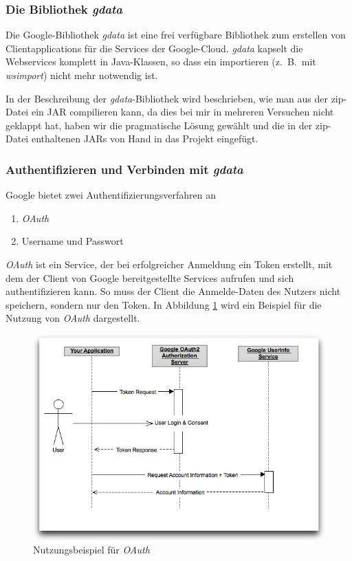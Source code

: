 \subsubsection{Die Bibliothek \emph{gdata}}
Die Google-Bibliothek \emph{gdata} ist eine frei verf\"ugbare Bibliothek zum erstellen von
 Clientapplications für die Services der Google-Cloud.
\emph{gdata} kapselt die Webservices komplett in Java-Klassen, so dass ein importieren
 (z.\ B.\ mit \emph{wsimport}) nicht mehr notwendig ist.

In der Beschreibung der \emph{gdata}-Bibliothek wird beschrieben, wie man aus der zip-Datei
 ein JAR compilieren kann, da dies bei mir in mehreren Versuchen nicht geklappt hat,
 haben wir die pragmatische Lösung gewählt und die in der zip-Datei enthaltenen JARs von Hand
 in das Projekt eingefügt.

\subsubsection{Authentifizieren und Verbinden mit \emph{gdata}}
Google bietet zwei Authentifizierungsverfahren an
\begin{enumerate}
	\item\emph{OAuth}
	\item Username und Passwort
\end{enumerate}
\emph{OAuth} ist ein Service, der bei erfolgreicher Anmeldung ein Token erstellt, mit dem
 der Client von Google bereitgestellte Services aufrufen und sich authentifizieren kann.
So muss der Client die Anmelde-Daten des Nutzers nicht speichern, sondern nur den Token.
In Abbildung \ref{fig:google_oauth} wird ein Beispiel f\"ur die Nutzung von \emph{OAuth} dargestellt.
\begin{figure}[h!]
\includegraphics[width=\textwidth]{Bilder/googleOauth.jpg}
\caption{Nutzungsbeispiel f\"ur \emph{OAuth}\cite{GO01}}
\label{fig:google_oauth}
\end{figure}

